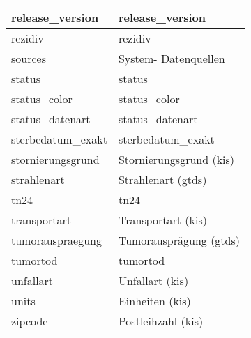 \begin{longtable}{||p{5.3cm}|p{9cm}||}
  	release\_version & release\_version\\ \hline
  	rezidiv & rezidiv\\ \hline
  	sources & System- Datenquellen\\ \hline
  	status & status\\ \hline
  	status\_color & status\_color\\ \hline
  	status\_datenart & status\_datenart\\ \hline
  	sterbedatum\_exakt & sterbedatum\_exakt\\ \hline
  	stornierungsgrund & Stornierungsgrund (\ac{kis})\\ \hline
  	strahlenart & Strahlenart (\ac{gtds})\\ \hline
  	tn24 & tn24\\ \hline
  	transportart & Transportart (\ac{kis})\\ \hline
  	tumorauspraegung & Tumorausprägung (\ac{gtds}) \\ \hline
  	tumortod & tumortod\\ \hline
  	unfallart & Unfallart (\ac{kis})\\ \hline
  	units & Einheiten (\ac{kis})\\ \hline
  	zipcode & Postleihzahl (\ac{kis})\\ \hline  
  \end{longtable}